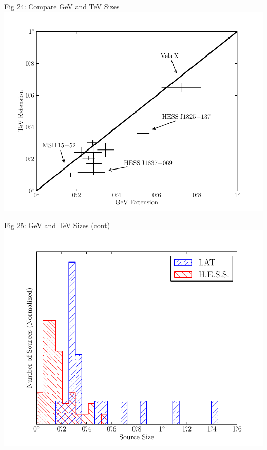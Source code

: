 \documentclass[12pt]{beamer}
\begin{document}
\begin{frame}{Fig 24: Compare GeV and TeV Sizes}
  \includegraphics[scale=0.50]{plots/gev_vs_tev_plot_color.pdf}
\end{frame}

\begin{frame}{Fig 25: GeV and TeV Sizes (cont)}
  \includegraphics[scale=0.40]{plots/gev_vs_tev_histogram_color.pdf}
\end{frame}
\end{document}
